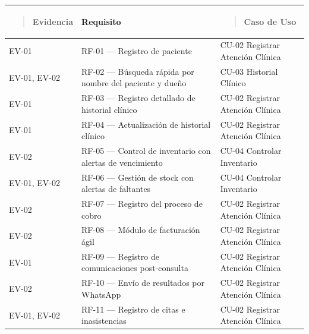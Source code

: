 \documentclass[
]{article}
\newcounter{none} %
\begin{document}
{\def\LTcaptype{none} %
\begin{longtable}[]{@{}
  >{\raggedright\arraybackslash}p{}
  >{\raggedright\arraybackslash}p{}
  >{\raggedright\arraybackslash}p{}@{}}
\toprule\noalign{}
\begin{minipage}[b]{\linewidth}\raggedright
\begin{quote}
\textbf{Evidencia}
\end{quote}
\end{minipage} & \begin{minipage}[b]{\linewidth}\centering
\textbf{Requisito}
\end{minipage} & \begin{minipage}[b]{\linewidth}\raggedright
\begin{quote}
\textbf{Caso de Uso}
\end{quote}
\end{minipage} \\
\midrule\noalign{}
\endhead
\bottomrule\noalign{}
\endlastfoot
EV-01 & RF-01 --- Registro de paciente & CU-02 Registrar Atención
Clínica \\
EV-01, EV-02 & RF-02 --- Búsqueda rápida por nombre del paciente y dueño
& CU-03 Historial Clínico \\
EV-01 & RF-03 --- Registro detallado de historial clínico & CU-02
Registrar Atención Clínica \\
EV-01 & RF-04 --- Actualización de historial clínico & CU-02 Registrar
Atención Clínica \\
EV-02 & RF-05 --- Control de inventario con alertas de vencimiento &
CU-04 Controlar Inventario \\
EV-01, EV-02 & RF-06 --- Gestión de stock con alertas de faltantes &
CU-04 Controlar Inventario \\
EV-02 & RF-07 --- Registro del proceso de cobro & CU-02 Registrar
Atención Clínica \\
EV-02 & RF-08 --- Módulo de facturación ágil & CU-02 Registrar Atención
Clínica \\
EV-01 & RF-09 --- Registro de comunicaciones post-consulta & CU-02
Registrar Atención Clínica \\
EV-02 & RF-10 --- Envío de resultados por WhatsApp & CU-02 Registrar
Atención Clínica \\
EV-01, EV-02 & RF-11 --- Registro de citas e inasistencias & CU-02
Registrar Atención Clínica \\

\end{longtable}}
\end{document}
